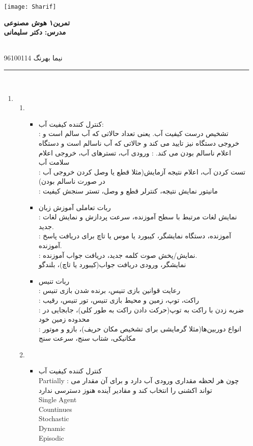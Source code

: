 \documentclass[11pt]{article}
\date{\today}
\newcommand{\lecture}[2]{
	{
		\begin{center}
			\vspace{-1cm}
			\texttt{[image: Sharif]}%
		\end{center}
		\vspace{-8mm}
		\begin{center}
			
			\bf
			{
				\Large
تمرین۱ هوش مصنوعی 
			}
			\\
مدرس: دکتر سلیمانی
			\\~
		\date{\today}
		\end{center}
	}\vspace*{-1em}
	\noindent
 #2 \hfill #1
	\vspace{-4mm}
	\rule{\textwidth}{1pt}
	\ \\
}
\begin{document}
	\lecture{96100114}{نیما بهرنگ}
	\begin{enumerate}

		\item
				\begin{enumerate}
			\item 
			\begin{itemize}
				\item 
				کنترل کننده کیفیت آب:\\
				:
				تشخیص درست کیفیت آب. یعنی تعداد حالاتی که آب سالم است و خروجی دستگاه نیز تایید می کند و حالاتی که آب ناسالم است و دستگاه اعلام ناسالم بودن می کند.
				:
				ورودی آب، تسترهای آب، خروجی اعلام سلامت آب\\
				
				:
				تست کردن آب، اعلام نتیجه آزمایش(مثلا قطع یا وصل کردن خروجی آب در صورت ناسالم بودن)\\
				:
				مانیتور نمایش نتیجه، کنترلر قطع و وصل، تستر سنجش کیفیت\\
				\item
				ربات تعاملی آموزش زبان\\
				:
				نمایش لغات مرتبط با سطح آموزنده، سرعت پردازش و نمایش لغات جدید.\\
				:
				آموزنده، دستگاه نمایشگر، کیبورد یا موس یا تاچ برای دریافت پاسخ آموزنده.\\
				:
				نمایش/پخش صوت کلمه جدید، دریافت جواب آموزنده.\\
				نمایشگر، ورودی دریافت جواب(کیبورد یا تاچ)، بلندگو\\
			\item
				ربات تنیس\\
				:
				رعایت قوانین بازی تنیس، برنده شدن بازی تنیس
			\\
			:
			راکت، توپ، زمین و محیط بازی تنیس، تور تنیس، رقیب\\
			:
			ضربه زدن با راکت به توپ(حرکت دادن راکت به طور کلی)، جابجایی در محدوده زمین خود\\
			:
			انواع دوربین‌ها(مثلا گرمایشی برای تشخیص مکان حریف)، بازو و موتور مکانیکی، شتاب سنج، سرعت سنج\\
			
				
			\end{itemize} 
	\item
	\begin{itemize}
		\item 
		کنترل کننده کیفیت آب\\
		Partially : چون هر لحظه مقداری ورودی آب دارد و برای آن مقدار می تواند اکشنی را انتخاب کند و مقادیر آینده هنوز دسترسی ندارد\\
		Single Agent\\
		Countinues\\
		Stochastic\\
		Dynamic\\
		Episodic\\
		

\end{itemize}
\end{enumerate}
\end{enumerate}
\end{document}
